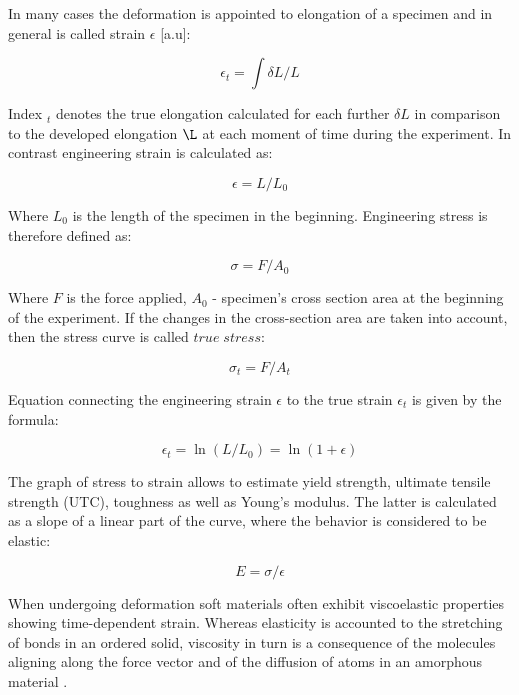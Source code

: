 In many cases the deformation is appointed to elongation of a specimen and in general is called strain $\epsilon$ [a.u]:

\begin{equation}
\epsilon_t = \int \delta L/L
\label{eq:true_strain}
\end{equation}

Index $_t$ denotes the true elongation calculated for each further $\delta L$ in comparison to the developed elongation $\L$ at each moment of time during the experiment. In contrast engineering strain is calculated as:

\begin{equation}
\epsilon = L/L_0
\label{eq:strain}
\end{equation}

Where $L_0$ is the length of the specimen in the beginning. Engineering stress is therefore defined as:

\begin{equation}
\sigma = F/A_0
\label{eq:eng_stress}
\end{equation}

Where $F$ is the force applied, $A_0$ - specimen's cross section area at the beginning of the experiment. If the changes in the cross-section area are taken into account, then the stress curve is called $true\;stress$:

\begin{equation}
\sigma_t = F/A_t
\label{eq:true_stress}
\end{equation}

Equation connecting the engineering strain $\epsilon$ to the true strain $\epsilon_t$ is given by the formula:

\begin{equation}
\epsilon_t = \ln (L/L_0) = \ln (1+\epsilon)
\label{eq:true_strain_eng_strain}
\end{equation}

The graph of stress to strain allows to estimate yield strength, ultimate tensile strength (UTC), toughness as well as Young's modulus. The latter is calculated as a slope of a linear part of the curve, where the behavior is considered to be elastic:

\begin{equation}
E = \sigma / \epsilon
\label{eq:young}
\end{equation}

When undergoing deformation soft materials often exhibit viscoelastic properties showing time-dependent strain. Whereas elasticity is accounted to the stretching of bonds in an ordered solid, viscosity in turn is a consequence of the molecules aligning along the force vector and of the diffusion of atoms in an amorphous material \cite{meyers2008mechanical}. 


